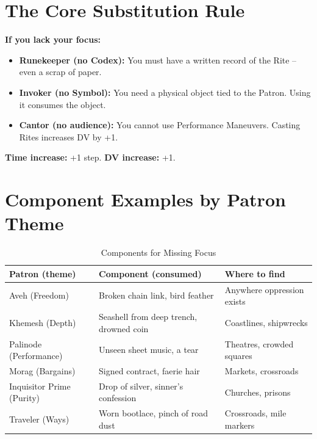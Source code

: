 \documentclass[10pt,a5paper]{book}
\begin{document}
\section{The Core Substitution Rule}

\begin{ritualnote}
\textbf{If you lack your focus:}
\begin{itemize}
    \item \textbf{Runekeeper (no Codex):} You must have a written record of the Rite -- even a scrap of paper.
    \item \textbf{Invoker (no Symbol):} You need a physical object tied to the Patron. Using it consumes the object.
    \item \textbf{Cantor (no audience):} You cannot use Performance Maneuvers. Casting Rites increases DV by +1.
\end{itemize}
\textbf{Time increase:} +1 step. \textbf{DV increase:} +1.
\end{ritualnote}

\section{Component Examples by Patron Theme}

\begin{center}
\begin{longtable}{p{3cm} p{4cm} p{4cm}}
\caption{Components for Missing Focus}\\
\toprule
Patron (theme) & Component (consumed) & Where to find \\
\midrule
Aveh (Freedom) & Broken chain link, bird feather & Anywhere oppression exists \\
Khemesh (Depth) & Seashell from deep trench, drowned coin & Coastlines, shipwrecks \\
Palinode (Performance) & Unseen sheet music, a tear & Theatres, crowded squares \\
Morag (Bargains) & Signed contract, faerie hair & Markets, crossroads \\
Inquisitor Prime (Purity) & Drop of silver, sinner's confession & Churches, prisons \\
Traveler (Ways) & Worn bootlace, pinch of road dust & Crossroads, mile markers \\
\bottomrule
\end{longtable}
\end{center}
\end{document}

